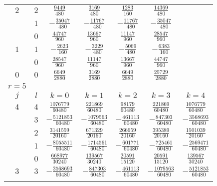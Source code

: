 \begin{table}
\begin{center}
\begin{tabular}{ccccccc}
      $2$  &  $2$  &  $ \frac{ 9449}{ 480}$  &  $ \frac{ 3169}{ 480}$  &  $ \frac{ 1283}{ 160}$  &  $ \frac{14369}{ 480}$  \\ \addlinespace
           &  $1$  &  $-\frac{35047}{ 480}$  &  $-\frac{11767}{ 480}$  &  $-\frac{11767}{ 480}$  &  $-\frac{35047}{ 480}$  \\ \addlinespace
           &  $0$  &  $ \frac{44747}{ 960}$  &  $ \frac{13667}{ 960}$  &  $ \frac{11147}{ 960}$  &  $ \frac{28547}{ 960}$  \\ \addlinespace
      $1$  &  $1$  &  $-\frac{ 2623}{ 160}$  &  $-\frac{ 3229}{ 480}$  &  $-\frac{ 5069}{ 480}$  &  $-\frac{ 6383}{ 160}$  \\ \addlinespace
           &  $0$  &  $ \frac{28547}{ 960}$  &  $ \frac{11147}{ 960}$  &  $ \frac{13667}{ 960}$  &  $ \frac{44747}{ 960}$  \\ \addlinespace
      $0$  &  $0$  &  $ \frac{ 6649}{2880}$  &  $ \frac{ 3169}{2880}$  &  $ \frac{ 6649}{2880}$  &  $ \frac{25729}{2880}$  \\ \addlinespace
      \midrule
      $r=5$  \\
      $j$  &  $l$  &  $k=0$                      &  $k=1$                     &  $k=2$                  &  $k=3$                        &  $k=4$                      \\ \addlinespace
      $4$  &  $4$  &  $ \frac{ 1076779}{60480}$  &  $ \frac{ 221869}{60480}$  &  $ \frac{  98179}{60480}$  &  $ \frac{ 221869}{60480}$  &  $ \frac{ 1076779}{60480}$  \\ \addlinespace
           &  $3$  &  $-\frac{ 5121853}{60480}$  &  $-\frac{1079563}{60480}$  &  $-\frac{ 461113}{60480}$  &  $-\frac{ 847303}{60480}$  &  $-\frac{ 3568693}{60480}$  \\ \addlinespace
           &  $2$  &  $ \frac{ 3141559}{20160}$  &  $ \frac{ 671329}{20160}$  &  $ \frac{ 266659}{20160}$  &  $ \frac{ 395389}{20160}$  &  $ \frac{ 1501039}{20160}$  \\ \addlinespace
           &  $1$  &  $-\frac{ 8055511}{60480}$  &  $-\frac{1714561}{60480}$  &  $-\frac{ 601771}{60480}$  &  $-\frac{ 725461}{60480}$  &  $-\frac{ 2569471}{60480}$  \\ \addlinespace
           &  $0$  &  $ \frac{  668977}{30240}$  &  $ \frac{ 139567}{30240}$  &  $ \frac{  20591}{15120}$  &  $ \frac{  20591}{15120}$  &  $ \frac{  139567}{30240}$  \\ \addlinespace
      $3$  &  $3$  &  $-\frac{ 3568693}{60480}$  &  $-\frac{ 847303}{60480}$  &  $-\frac{ 461113}{60480}$  &  $-\frac{1079563}{60480}$  &  $-\frac{ 5121853}{60480}$  \\ \addlinespace

\end{tabular}
\end{center}
\end{table}
